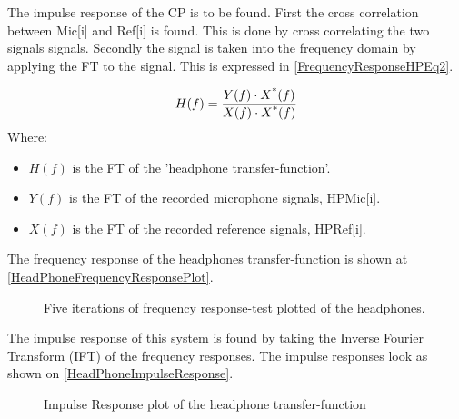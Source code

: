 The impulse response of the CP is to be found.
First the cross correlation between Mic[i] and Ref[i] is found. This is done by cross correlating the two signals signals. Secondly the signal is taken into the frequency domain by applying the FT to the signal. This is expressed in \autoref{FrequencyResponseHPEq2}.



\begin{equation}\label{FrequencyResponseHPEq2}
H(f) = \frac{Y(f) \cdot X\textsuperscript{*}(f)}{X(f) \cdot X\textsuperscript{*}(f)}
\end{equation}
Where:
\begin{itemize}
	\item $H(f)$ is the FT of the 'headphone transfer-function'.
	\item $Y(f)$ is the FT of the recorded microphone signals, HPMic[i].
	\item $X(f)$ is the FT of the recorded reference signals, HPRef[i].
\end{itemize}


The frequency response of the headphones transfer-function is shown at \autoref{HeadPhoneFrequencyResponsePlot}.

\begin{figure}[H]
	\centering
	
	\caption{Five iterations of frequency response-test plotted of the headphones.}
	\label{HeadPhoneFrequencyResponsePlot}
\end{figure}



The impulse response of this system is found by taking the Inverse Fourier Transform (IFT) of the frequency responses.
The impulse responses look as shown on \autoref{HeadPhoneImpulseResponse}.


\begin{figure}[H]
	\centering
	
	\caption{Impulse Response plot of the headphone transfer-function }
	\label{HeadPhoneImpulseResponse}
\end{figure}

%	

